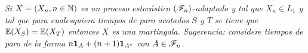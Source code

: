 \emph{
	Si ${X=\left( X_n,n\in\mathbb{N}\right) }$ es un proceso estoc\'astico ${\left( \mathscr{F}_n\right) }$-adaptado y tal que ${X_n\in L_1}$ y tal que 
	para cualesquiera tiempos de paro acotados ${S}$ y ${T}$ se tiene que ${\mathbb{E}\! \left( X_S \right)=\mathbb{E}\! \left( X_T \right)}$ entonces ${X}$ es una 
	martingala. Sugerencia: considere tiempos de paro de la forma ${n{\bf{1}}_{A}+(n+1){\bf{1}}_{A^c}}$ con ${A\in\mathscr{F}_n}$.
}
